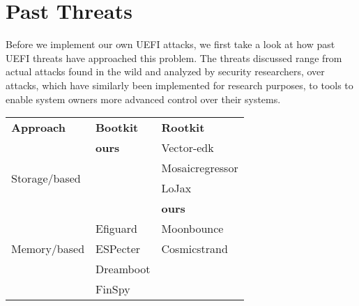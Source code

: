 
\chapter{Past Threats}


Before we implement our own \ac{UEFI} attacks, we first take a look at how past \ac{UEFI} threats have approached this problem.
The threats discussed range from actual attacks found in the wild and analyzed by security researchers, over attacks, which have similarly been implemented for research purposes, to tools to enable system owners more advanced control over their systems.

\begin{center}
    \begin{tabular}{lll}
        \toprule
        {\bfseries Approach}               & {\bfseries Bootkit} & {\bfseries Rootkit} \\
        \cmidrule[0.4pt](r){1-1}
        \cmidrule[0.4pt](l){2-3}
        \multirow{4}{4em}{Storage\-/based} & \textbf{ours}       & Vector-edk          \\
                                           &                     & Mosaicregressor     \\
                                           &                     & LoJax               \\
                                           &                     & \textbf{ours}       \\
        \cmidrule[0.4pt](r){1-1}
        \cmidrule[0.4pt](l){2-3}
        \multirow{3}{4em}{Memory\-/based}  & Efiguard            & Moonbounce          \\
                                           & ESPecter            & Cosmicstrand        \\
                                           & Dreamboot           &                     \\
                                           & FinSpy              &                     \\
        \bottomrule
    \end{tabular}
\end{center}

